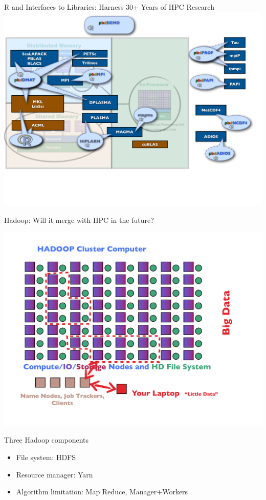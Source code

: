 \begin{frame}{R and \pbdR Interfaces to Libraries: Harness 30+ Years of
    HPC Research}
\includegraphics[height=1.05\textheight]
{../common/pics/hardware/ParallelHardware14.pdf}
\end{frame}

\begin{frame}{Hadoop: Will it merge with HPC in the future?}
\begin{minipage}{10cm}
  \includegraphics[height=0.9\textheight]
  {../common/pics/hardware/ParallelHardware23.pdf}
\end{minipage}
\begin{minipage}{5cm}\small
  \begin{block}{Three Hadoop components}\pause
    \begin{itemize}[<+-|alert@+>]
    \item File system: HDFS
    \item Resource manager: Yarn
    \item Algorithm limitation: Map Reduce, Manager+Workers
    \end{itemize}
  \end{block}
\end{minipage}
\end{frame}

